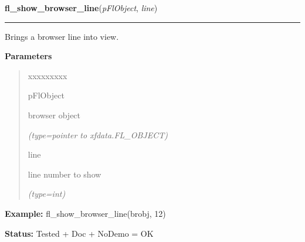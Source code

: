     \vspace{0.5ex}

\hspace{.8\funcindent}\begin{boxedminipage}{\funcwidth}

    \raggedright \textbf{fl\_show\_browser\_line}(\textit{pFlObject}, \textit{line})

    \vspace{-1.5ex}

    \rule{\textwidth}{0.5\fboxrule}
\setlength{\parskip}{2ex}
    Brings a browser line into view.

\setlength{\parskip}{1ex}
      \textbf{Parameters}
      \vspace{-1ex}

      \begin{quote}
        \begin{Ventry}{xxxxxxxxx}

          \item[pFlObject]

          browser object

            {\it (type=pointer to xfdata.FL\_OBJECT)}

          \item[line]

          line number to show

            {\it (type=int)}

        \end{Ventry}

      \end{quote}

\textbf{Example:} fl\_show\_browser\_line(brobj, 12)



\textbf{Status:} Tested + Doc + NoDemo = OK



    \end{boxedminipage}

    \label{xformslib:flbrowser:fl_set_browser_hscroll_callback}

    \vspace{0.5ex}

